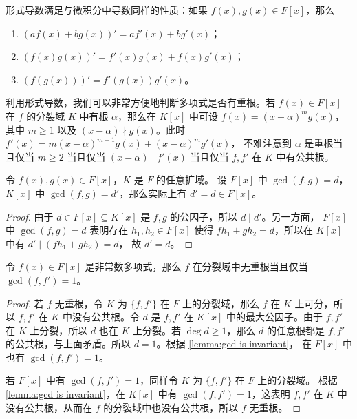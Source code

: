 形式导数满足与微积分中导数同样的性质：如果 $f(x),g(x)\in F[x]$，那么
\begin{enumerate}
  \item $(af(x)+bg(x))'=af'(x)+bg'(x)$；
  \item $(f(x)g(x))'=f'(x)g(x)+f(x)g'(x)$；
  \item $(f(g(x)))'=f'(g(x))g'(x)$。
\end{enumerate}
利用形式导数，我们可以非常方便地判断多项式是否有重根。若 $f(x)\in F[x]$
在 $f$ 的分裂域 $K$ 中有根 $\alpha$，那么在 $K[x]$ 中可设 $f(x)=(x-\alpha)^mg(x)$，
其中 $m\geq 1$ 以及 $(x-\alpha)\nmid g(x)$。此时 $f'(x)=m(x-\alpha)^{m-1}g(x)+(x-\alpha)^mg'(x)$，
不难注意到 $\alpha$ 是重根当且仅当 $m\geq 2$ 当且仅当 $(x-\alpha)\mid f'(x)$
当且仅当 $f,f'$ 在 $K$ 中有公共根。

\begin{lemma}\label{lemma:gcd is invariant}
  令 $f(x),g(x)\in F[x]$，$K$ 是 $F$ 的任意扩域。
  设 $F[x]$ 中 $\gcd(f,g)=d$， $K[x]$ 中 $\gcd(f,g)=d'$，那么实际上有
  $d'=d\in F[x]$。
\end{lemma}
\begin{proof}
  由于 $d\in F[x]\subseteq K[x]$
  是 $f,g$ 的公因子，所以 $d\mid d'$。另一方面，
  $F[x]$ 中 $\gcd(f,g)=d$ 表明存在 $h_1,h_2\in F[x]$
  使得 $fh_1+gh_2=d$，所以在 $K[x]$ 中有 $d'\mid (fh_1+gh_2)=d$，
  故 $d'=d$。
\end{proof}

\begin{proposition}\label{prop:separable polynomial test}
  令 $f(x)\in F[x]$ 是非常数多项式，那么 $f$ 在分裂域中无重根当且仅当
  $\gcd(f,f')=1$。
\end{proposition}
\begin{proof}
  若 $f$ 无重根，令 $K$ 为 $\{f,f'\}$ 在 $F$ 上的分裂域，那么 $f$
  在 $K$ 上可分，所以 $f,f'$ 在 $K$ 中没有公共根。令 $d$
  是 $f,f'$ 在 $K[x]$ 中的最大公因子。由于 $f,f'$ 在 $K$ 上分裂，所以
  $d$ 也在 $K$ 上分裂。若 $\deg d\geq 1$，那么 $d$ 的任意根都是
  $f,f'$ 的公共根，与上面矛盾。所以 $d=1$。根据 \autoref{lemma:gcd is invariant}，
  在 $F[x]$ 中也有 $\gcd(f,f')=1$。

  若 $F[x]$ 中有 $\gcd(f,f')=1$，同样令 $K$ 为 $\{f,f'\}$ 在 $F$ 上的分裂域。
  根据 \autoref{lemma:gcd is invariant}，在 $K[x]$ 中有
  $\gcd(f,f')=1$，这表明 $f,f'$ 在 $K$ 中没有公共根，从而在
  $f$ 的分裂域中也没有公共根，所以 $f$ 无重根。
\end{proof}

